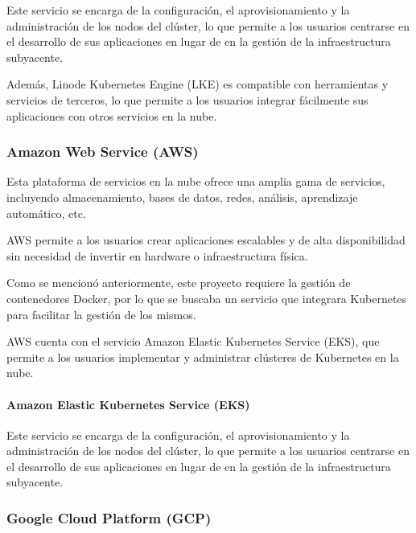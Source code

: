                     Este servicio se encarga de la configuración, el aprovisionamiento y la administración de los nodos del clúster, lo que permite a los usuarios centrarse en el desarrollo de sus aplicaciones en lugar de en la gestión de la infraestructura subyacente.
                    
                    Además, Linode Kubernetes Engine (LKE) es compatible con herramientas y servicios de terceros, lo que permite a los usuarios integrar fácilmente sus aplicaciones con otros servicios en la nube.

            \subsubsection{Amazon Web Service (AWS)}
                \label{sec:aws}

                Esta plataforma de servicios en la nube ofrece una amplia gama de servicios, incluyendo almacenamiento, bases de datos, redes, análisis, aprendizaje automático, etc.
                
                AWS permite a los usuarios crear aplicaciones escalables y de alta disponibilidad sin necesidad de invertir en hardware o infraestructura física.

                Como se mencionó anteriormente, este proyecto requiere la gestión de contenedores Docker, por lo que se buscaba un servicio que integrara Kubernetes para facilitar la gestión de los mismos.

                AWS cuenta con el servicio Amazon Elastic Kubernetes Service (EKS), que permite a los usuarios implementar y administrar clústeres de Kubernetes en la nube.

                \paragraph{Amazon Elastic Kubernetes Service (EKS)}

                    Este servicio se encarga de la configuración, el aprovisionamiento y la administración de los nodos del clúster, lo que permite a los usuarios centrarse en el desarrollo de sus aplicaciones en lugar de en la gestión de la infraestructura subyacente.


            \subsubsection{Google Cloud Platform (GCP)}

